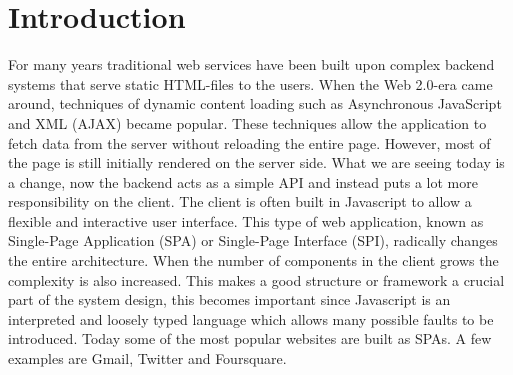 \chapter{Introduction}

\setcounter{section}{1}


For many years traditional web services have been built upon complex backend systems that serve static HTML-files to the users. When the Web 2.0-era came around, techniques of dynamic content loading such as Asynchronous JavaScript and XML (AJAX) became popular. These techniques allow the application to fetch data from the server without reloading the entire page. However, most of the page is still initially rendered on the server side. What we are seeing today is a change, now the backend acts as a simple API and instead puts a lot more responsibility on the client. The client is often built in Javascript to allow a flexible and interactive user interface. This type of web application, known as Single-Page Application (SPA) or Single-Page Interface (SPI), radically changes the entire architecture. When the number of components in the client grows the complexity is also increased. This makes a good structure or framework a crucial part of the system design, this becomes important since Javascript is an interpreted and loosely typed language which allows many possible faults to be introduced. Today some of the most popular websites are built as SPAs. A few examples are Gmail, Twitter and Foursquare.


